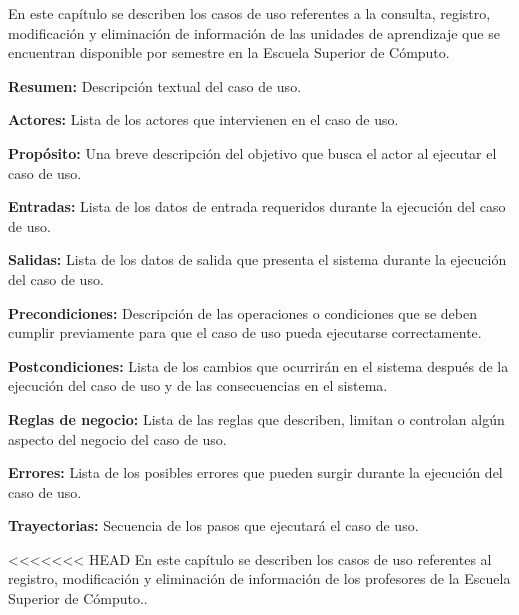 En este capítulo se describen los casos de uso referentes a la consulta, registro, modificación y eliminación de información de las unidades de aprendizaje que se encuentran disponible por semestre en la Escuela Superior de Cómputo. \bigskip

\begin{objetivos}
	\item {\bf Resumen:} Descripción textual del caso de uso.
	\item {\bf Actores:} Lista de los actores que intervienen en el caso de uso.
	\item {\bf Propósito:} Una breve descripción del objetivo que busca el actor al ejecutar el caso de uso.
	\item {\bf Entradas:} Lista de los datos de entrada requeridos durante la ejecución del caso de uso.
	\item {\bf Salidas:} Lista de los datos de salida que presenta el sistema durante la ejecución del caso de uso.
	\item {\bf Precondiciones:} Descripción de las operaciones o condiciones que se deben cumplir previamente para que el caso de uso pueda ejecutarse correctamente.
	\item {\bf Postcondiciones:} Lista de los cambios que ocurrirán en el sistema después de la ejecución del caso de uso y de las consecuencias en el sistema.
	\item {\bf Reglas de negocio:} Lista de las reglas que describen, limitan o controlan algún aspecto del negocio del caso de uso.
	\item {\bf Errores:} Lista de los posibles errores que pueden surgir durante la ejecución del caso de uso.
	\item {\bf Trayectorias:} Secuencia de los pasos que ejecutará el caso de uso.
\end{objetivos}


<<<<<<< HEAD
En este capítulo se describen los casos de uso referentes al registro, modificación y eliminación de información de los profesores de la Escuela Superior de Cómputo.. \bigskip

